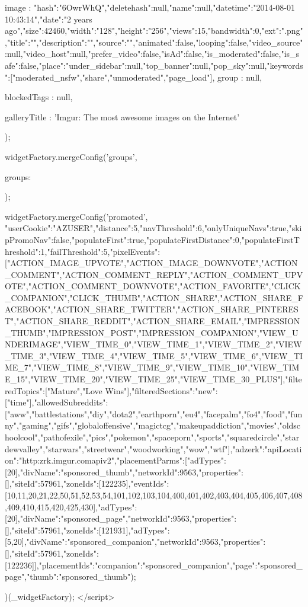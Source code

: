 {{{{            image               : {"hash":"6OwrWhQ","deletehash":null,"name":null,"datetime":"2014-08-01 10:43:14","date":"2 years ago","size":42460,"width":"128","height":"256","views":15,"bandwidth":0,"ext":".png","title":"","description":"","source":"","animated":false,"looping":false,"video_source":null,"video_host":null,"prefer_video":false,"isAd":false,"is_moderated":false,"is_safe":false,"place":{"under_sidebar":null,"top_banner":null,"pop_sky":null,"keywords":["moderated_nsfw","share","unmoderated","page_load"]}},
            group               : null,
        
            blockedTags         : null,
        
        
            galleryTitle        : 'Imgur: The most awesome images on the Internet'
        });

        widgetFactory.mergeConfig('groups', {
            groups: {
                
            }
        });

        widgetFactory.mergeConfig('promoted', {"userCookie":"AZUSER","distance":5,"navThreshold":6,"onlyUniqueNavs":true,"skipPromoNav":false,"populateFirst":true,"populateFirstDistance":0,"populateFirstThreshold":1,"failThreshold":5,"pixelEvents":["ACTION_IMAGE_UPVOTE","ACTION_IMAGE_DOWNVOTE","ACTION_COMMENT","ACTION_COMMENT_REPLY","ACTION_COMMENT_UPVOTE","ACTION_COMMENT_DOWNVOTE","ACTION_FAVORITE","CLICK_COMPANION","CLICK_THUMB","ACTION_SHARE","ACTION_SHARE_FACEBOOK","ACTION_SHARE_TWITTER","ACTION_SHARE_PINTEREST","ACTION_SHARE_REDDIT","ACTION_SHARE_EMAIL","IMPRESSION_THUMB","IMPRESSION_POST","IMPRESSION_COMPANION","VIEW_UNDERIMAGE","VIEW_TIME_0","VIEW_TIME_1","VIEW_TIME_2","VIEW_TIME_3","VIEW_TIME_4","VIEW_TIME_5","VIEW_TIME_6","VIEW_TIME_7","VIEW_TIME_8","VIEW_TIME_9","VIEW_TIME_10","VIEW_TIME_15","VIEW_TIME_20","VIEW_TIME_25","VIEW_TIME_30_PLUS"],"filteredTopics":["Mature","Love Wins"],"filteredSections":{"new":["time"]},"allowedSubreddits":["aww","battlestations","diy","dota2","earthporn","eu4","facepalm","fo4","food","funny","gaming","gifs","globaloffensive","magictcg","makeupaddiction","movies","oldschoolcool","pathofexile","pics","pokemon","spaceporn","sports","squaredcircle","stardewvalley","starwars","streetwear","woodworking","wow","wtf"],"adzerk":{"apiLocation":"http:\/\/zrk.imgur.com\/api\/v2","placementParms":[{"adTypes":[20],"divName":"sponsored_thumb","networkId":9563,"properties":[],"siteId":57961,"zoneIds":[122235],"eventIds":[10,11,20,21,22,50,51,52,53,54,101,102,103,104,400,401,402,403,404,405,406,407,408,409,410,415,420,425,430]},{"adTypes":[20],"divName":"sponsored_page","networkId":9563,"properties":[],"siteId":57961,"zoneIds":[121931]},{"adTypes":[5,20],"divName":"sponsored_companion","networkId":9563,"properties":[],"siteId":57961,"zoneIds":[122236]}],"placementIds":{"companion":"sponsored_companion","page":"sponsored_page","thumb":"sponsored_thumb"}}});
    })(_widgetFactory);
    </script>

}}
